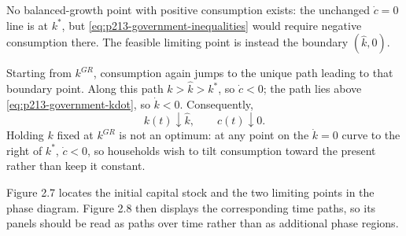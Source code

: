 \begin{solution}
\begin{enumerate}[label=(\alph*)]
    No balanced-growth point with positive consumption exists: the
    unchanged \(\dot c=0\) line is at \(k^*\), but
    \eqref{eq:p213-government-inequalities} would require negative
    consumption there. The feasible limiting point is instead the boundary
    \((\widehat{k},0)\).

    Starting from \(k^{GR}\), consumption again jumps to the unique path
    leading to that boundary point. Along this path
    \(k>\widehat{k}>k^*\),
    so \(\dot c<0\); the path lies above
    \eqref{eq:p213-government-kdot}, so \(\dot k<0\). Consequently,
    \[
        k(t)\downarrow\widehat{k},
        \qquad
        c(t)\downarrow0.
    \]
    Holding \(k\) fixed at \(k^{GR}\) is not an optimum: at any point on
    the \(\dot k=0\) curve to the right of \(k^*\),
    \(\dot c<0\), so households wish to tilt consumption toward the
    present rather than keep it constant.
\end{enumerate}

Figure 2.7 locates the initial capital stock and the two limiting points in
the phase diagram. Figure 2.8 then displays the corresponding time paths,
so its panels should be read as paths over time rather than as additional
phase regions.

\begin{figure}[H]
    \centering
\end{figure}
\end{solution}
